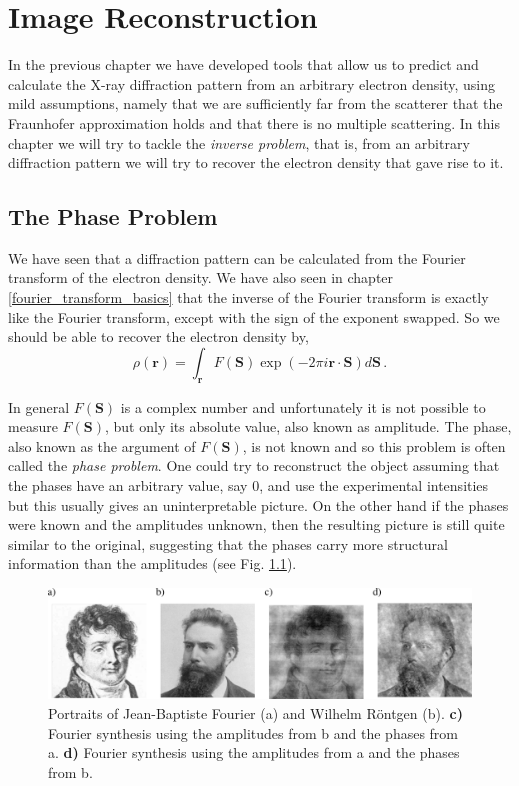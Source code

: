 \chapter{Image Reconstruction}\label{Image Reconstruction}\noindent

In the previous chapter we have developed tools that allow us to predict
and calculate the X-ray diffraction pattern from an arbitrary electron density,
using mild assumptions, namely that we are sufficiently far from the scatterer
that the Fraunhofer approximation holds and that there is no multiple
scattering.
In this chapter we will try to tackle the {\em inverse
  problem}, that is, from an arbitrary diffraction pattern we will try to
recover the electron density that gave rise to it.
\section{The Phase Problem}

We have seen that a diffraction pattern can be calculated from the Fourier
transform of the electron density. We have also seen in chapter
\ref{fourier_transform_basics} that the inverse of the Fourier transform is
exactly like the Fourier transform, except with the sign of the exponent
swapped. So we should be able to recover the electron density by,
\begin{equation}
\rho(\mathbf r) = \int_{\mathbf r} F(\mathbf S) \exp\left(-2
    \pi i \mathbf r \cdot \mathbf S \right) d\mathbf S\, .
\end{equation}

In general $F(\mathbf S)$ is a complex number and unfortunately it is not
possible to measure $F(\mathbf S)$, but only its absolute value, also known as
amplitude. The phase, also known as the argument of $F(\mathbf S)$, is not known and so
this problem is often called the {\em phase problem}. One could try to reconstruct the
object assuming that the phases have an arbitrary value, say 0, and use the
experimental intensities but this usually gives an uninterpretable picture. On
the other hand if the phases were known and the amplitudes unknown, then the
resulting picture is still quite similar to the original, suggesting that the
phases carry more structural information than the amplitudes (see Fig. \ref{Fig:PhaseSwapping}).
\begin{figure}[h]
  \centering
  \includegraphics[width=1 \columnwidth]{Image_Reconstruction/PhaseSwapping2.png}
  \caption{Portraits of Jean-Baptiste Fourier (a) and Wilhelm R\"{o}ntgen (b).
    {\bf c)} Fourier synthesis using the amplitudes from b and the phases from
    a. {\bf d)}
    Fourier synthesis using the amplitudes from a and the phases from b.}
  \label{Fig:PhaseSwapping}
\end{figure}

